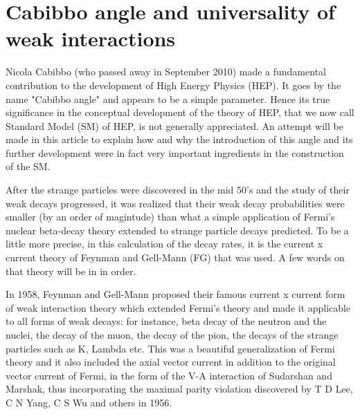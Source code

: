 \chapter[Cabibbo angle and universality of weak interactions]{Cabibbo angle and universality of weak interactions}\label{chap21}




         
Nicola Cabibbo (who passed away in September 2010)
made a fundamental contribution to the 
development of High Energy Physics (HEP). It 
goes by the name "Cabibbo angle" and appears to be
a simple parameter. Hence its true significance in the
conceptual development of the theory of HEP, that we now
call Standard Model (SM) of HEP, is not generally appreciated.  
An attempt will be made in this article to explain how and why
the introduction of this angle and its further development 
were in fact very important ingredients in the construction
of the SM.

After the strange particles were discovered in the mid 50's
and the study of their weak decays progressed, it was realized
that their weak decay probabilities were smaller (by an 
order of magintude) than what a simple application of Fermi's
nuclear beta-decay theory extended to strange particle decays
predicted. To be a little more precise, in this calculation
of the decay rates, it is the current x current theory of
Feynman and Gell-Mann (FG) that was used. A few words on 
that theory will be in in order.
 
In 1958, Feynman and Gell-Mann proposed 
their famous current x current form of weak interaction theory
which extended Fermi's theory and made it applicable to all 
forms of weak decays: for instance, beta decay of the neutron and the
nuclei, the decay of the muon, the decay of the pion, the decays of the
strange particles such as K, Lambda etc. This was a beautiful
generalization of Fermi theory and it also included the axial
vector current in addition to the original vector current of
Fermi, in the form of the V-A interaction of Sudarshan 
and Marshak, thus incorporating the maximal parity violation 
discovered by T D Lee, C N Yang, C S Wu and others in 1956.

